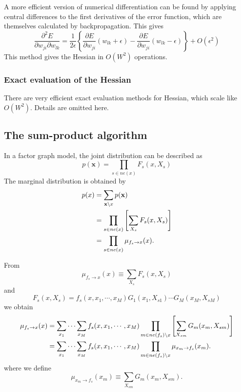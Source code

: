 \documentclass[a4paper]{book}
\renewcommand{\bf}{\mathbf}
\begin{document}
A more efficient version of numerical differentiation can be found by applying central differences to the first derivatives of the error function, which are themselves calculated by backpropagation. This gives
\begin{equation}
	\frac{\partial^2 E}{\partial w_{ji}\partial w_{lk}} = \frac{1}{2\epsilon}\left\{ \frac{\partial E}{\partial w_{ji}} (w_{lk}+\epsilon) -\frac{\partial E}{\partial w_{ji}} (w_{lk}-\epsilon)\right\} + O(\epsilon^2)
\end{equation}
This method gives the Hessian in $O(W^2)$ operations.
\subsubsection{Exact evaluation of the Hessian}
There are very efficient exact evaluation methods for Hessian, which scale like $O(W^2)$. Details are omitted here.
\subsection{The sum-product algorithm}\label{SumProd}
In a factor graph model, the joint distribution can be described as
\begin{equation}
	p(\bf{x}) = \prod_{s \in ne(x)} F_s(x,X_s)
\end{equation}
The marginal distribution is obtained by
\begin{align}
	p(x) &= \sum_{\bf{x}\backslash x} p(\bf{x}) \notag \\
	&= \prod_{s \in ne(x)} \left[ \sum_{X_s} F_s(x,X_s) \right] \notag \\
	&= \prod_{s \in ne(x)} \mu_{f_s \rightarrow x}(x).
\end{align}

From 
\begin{equation}
	\mu_{f_s \rightarrow x}(x) \equiv \sum_{X_s} F_s(x,X_s)
\end{equation}
and 
\begin{equation}
	F_s(x,X_s) = f_s(x,x_1,\cdots,x_M) G_1(x_1,X_{s1}) \cdots G_M(x_M,X_{sM})
\end{equation}
we obtain
\begin{align}
	\mu_{f_s \rightarrow x}(x) &= \sum_{x_1}\cdots \sum_{x_M} f_s(x,x_1,\cdots,x_M)\prod_{m \in ne(f_s) \backslash x}\left[\sum_{X_{sm}}G_m(x_m,X_{sm}) \right]\notag \\
	&= \sum_{x_1}\cdots \sum_{x_M} f_s(x,x_1,\cdots,x_M) \prod_{m \in ne(f_s) \backslash x}\mu_{x_m \rightarrow f_s}(x_m).
\end{align}
where we define
\begin{equation}
	\mu_{x_m \rightarrow f_s}(x_m)\equiv \sum_{X_{sm}} G_m(x_m, X_{sm}).
\end{equation}
\end{document}
